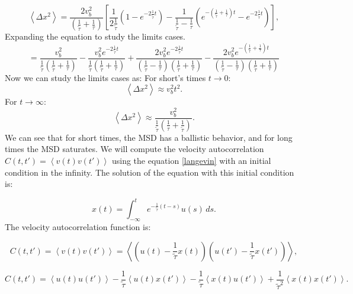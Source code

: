 \documentclass[%
10pt,
superscriptaddress,
twocolumn,
 amsmath,amssymb,
 aps,prx,
]{revtex4-2}
\begin{document}
\begin{equation}
	\label{MSD}
	\left<\Delta x^2\right>=\frac{2v_b^2}{(\frac{1}{\tilde{\tau}}+\frac{1}{\tau})}\left[\frac{1}{2\frac{1}{\tilde{\tau}}}(1-e^{-2\frac{1}{\tilde{\tau}} t})-\frac{1}{\frac{1}{\tilde{\tau}}-\frac{1}{\tau}}(e^{-(\frac{1}{\tilde{\tau}}+\frac{1}{\tau})t}-e^{-2\frac{1}{\tilde{\tau}} t})\right],
\end{equation}
Expanding the equation to study the limits cases.
\begin{equation}
	=\frac{v_b^2}{\frac{1}{\tilde{\tau}}(\frac{1}{\tilde{\tau}}+\frac{1}{\tau})}-\frac{v_b^2e^{-2\frac{1}{\tilde{\tau}} t}}{\frac{1}{\tilde{\tau}}(\frac{1}{\tilde{\tau}}+\frac{1}{\tau})}+\frac{2v_b^2e^{-2\frac{1}{\tilde{\tau}} t}}{(\frac{1}{\tilde{\tau}}-\frac{1}{\tau})(\frac{1}{\tilde{\tau}}+\frac{1}{\tau})}-\frac{2v_b^2e^{-(\frac{1}{\tilde{\tau}}+\frac{1}{\tau}) t}}{(\frac{1}{\tilde{\tau}}-\frac{1}{\tau})(\frac{1}{\tilde{\tau}}+\frac{1}{\tau})}
\end{equation}
Now we can study the limits cases as:
For short's times $t \to 0$:
\begin{equation}
	\label{tcortos}
	\left<\Delta x^2\right>\approx v_b^2 t^2.
\end{equation}
For $t \to \infty$:
\begin{equation}
	\label{tlargos}
	\left<\Delta x^2\right>\approx \frac{v_b^2}{\frac{1}{\tilde{\tau}}(\frac{1}{\tau}+\frac{1}{\tilde{\tau}})}.
\end{equation}
We can see that for short times, the MSD has a ballistic behavior, and for long times the MSD saturates. We will compute the velocity autocorrelation  $C(t,t') = \left< v(t)v(t')\right>$ using the equation \ref{langevin} with an initial condition in the infinity. The solution of the equation with this initial condition is:

\begin{equation}
	\label{solinfinity}
	x(t)=\int_{-\infty}^{t}e^{-\frac{1}{\tilde{\tau}}(t-s)}  u(s)\, ds.
\end{equation}
The velocity autocorrelation function is: 

\begin{equation}
	C(t,t')= \left< v(t)v(t')\right>=\left<(u(t)-\frac{1}{\tilde{\tau}} x(t))(u(t')-\frac{1}{\tilde{\tau}} x(t'))\right>,
\end{equation}

\begin{equation}
	C(t,t') = \left<u(t)u(t')\right>- \frac{1}{\tilde{\tau}} \left<u(t)x(t')\right>- \frac{1}{\tilde{\tau}} \left<x(t)u(t')\right>+\frac{1}{\tilde{\tau}^2}  \left<x(t)x(t')\right>.
\end{equation}
\end{document}
